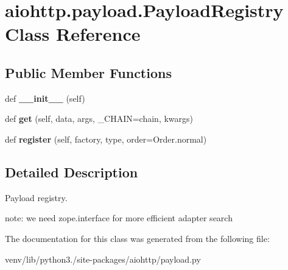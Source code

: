 \hypertarget{classaiohttp_1_1payload_1_1_payload_registry}{}\section{aiohttp.\+payload.\+Payload\+Registry Class Reference}
\label{classaiohttp_1_1payload_1_1_payload_registry}
\subsection*{Public Member Functions}
\begin{DoxyCompactItemize}
\item 
\mbox{\label{classaiohttp_1_1payload_1_1_payload_registry_ae31ebb360e20dfc27f41f119258561e3}} 
def {\bfseries \+\_\+\+\_\+init\+\_\+\+\_\+} (self)
\item 
\mbox{\label{classaiohttp_1_1payload_1_1_payload_registry_a6f8308db49201148f14b922f174ab314}} 
def {\bfseries get} (self, data, args, \+\_\+\+C\+H\+A\+IN=chain, kwargs)
\item 
\mbox{\label{classaiohttp_1_1payload_1_1_payload_registry_a58d1a65ee32e871263745f08f9ab2b49}} 
def {\bfseries register} (self, factory, type, order=Order.\+normal)
\end{DoxyCompactItemize}


\subsection{Detailed Description}
\begin{DoxyVerb}Payload registry.

note: we need zope.interface for more efficient adapter search
\end{DoxyVerb}
 

The documentation for this class was generated from the following file\+:\begin{DoxyCompactItemize}
\item 
venv/lib/python3./site-\/packages/aiohttp/payload.\+py\end{DoxyCompactItemize}
